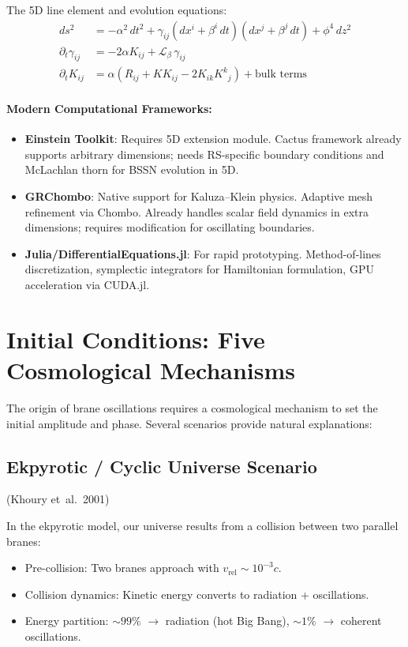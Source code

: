 The 5D line element and evolution equations:
\begin{align}
ds^2 &= -\alpha^2\,dt^2 + \gamma_{ij}(dx^i + \beta^i\,dt)(dx^j + \beta^j\,dt) + \phi^4\,dz^2 \\
\partial_t \gamma_{ij} &= -2\alpha K_{ij} + \mathcal{L}_\beta\,\gamma_{ij} \\
\partial_t K_{ij} &= \alpha(R_{ij} + KK_{ij} - 2K_{ik}K^k{}_j) + \text{bulk terms}
\end{align}

\paragraph{Modern Computational Frameworks:}
\begin{itemize}
  \item \textbf{Einstein Toolkit}: Requires 5D extension module. Cactus framework already supports arbitrary dimensions; needs RS-specific boundary conditions and McLachlan thorn for BSSN evolution in 5D.
  \item \textbf{GRChombo}: Native support for Kaluza--Klein physics. Adaptive mesh refinement via Chombo. Already handles scalar field dynamics in extra dimensions; requires modification for oscillating boundaries.
  \item \textbf{Julia/DifferentialEquations.jl}: For rapid prototyping. Method-of-lines discretization, symplectic integrators for Hamiltonian formulation, GPU acceleration via CUDA.jl.
\end{itemize}

\section{Initial Conditions: Five Cosmological Mechanisms}
\label{sec:initial_conditions}

The origin of brane oscillations requires a cosmological mechanism to set the initial amplitude and phase. Several scenarios provide natural explanations:

\subsection{Ekpyrotic / Cyclic Universe Scenario}
(Khoury et~al.\ 2001)

In the ekpyrotic model, our universe results from a collision between two parallel branes:
\begin{itemize}
  \item Pre-collision: Two branes approach with $v_\text{rel} \sim 10^{-3}c$.
  \item Collision dynamics: Kinetic energy converts to radiation + oscillations.
  \item Energy partition: $\sim 99\%$ $\to$ radiation (hot Big Bang), $\sim 1\%$ $\to$ coherent oscillations.
\end{itemize}

